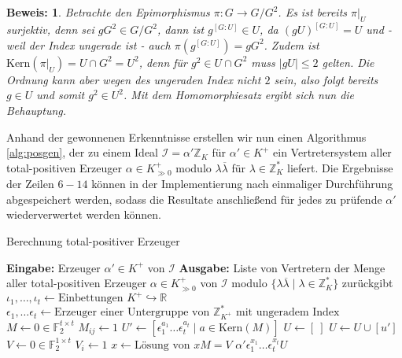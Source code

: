 \documentclass[12pt,a4paper,halfparskip,headsepline,bibtotocnumbered]{scrreprt}
\theoremstyle{nummermitklammern}
\theoremstyle{nonumberbreak}
\newtheorem{beweis}{Beweis:}
\newcommand{\Z}{\mathbb{Z}}
\newcommand{\R}{\mathbb{R}}
\newcommand{\F}{\mathbb{F}}
\newcommand{\I}{\mathcal{I}}
\newcommand{\Kern}{\text{Kern}}
\begin{document}
\begin{beweis}
	Betrachte den Epimorphismus $\pi : G \rightarrow G / G^2$. Es ist bereits $\pi\vert_U$ surjektiv, denn sei $gG^2 \in G / G^2$, dann ist $g^{\left[ G : U \right]} \in U$, da $(gU)^{\left[ G : U \right]} = U$ und - weil der Index ungerade ist - auch $\pi\left(g^{\left[ G : U \right]}\right) = gG^2$. Zudem ist $\Kern(\pi\vert_U) = U \cap G^2 = U^2$, denn für $g^2 \in U\cap G^2$ muss $\vert gU \vert \leq 2$ gelten. Die Ordnung kann aber wegen des ungeraden Index nicht $2$ sein, also folgt bereits $g \in U$ und somit $g^2 \in U^2$. Mit dem Homomorphiesatz ergibt sich nun die Behauptung.
\end{beweis}

Anhand der gewonnenen Erkenntnisse erstellen wir nun einen Algorithmus \eqref{alg:posgen}, der zu einem Ideal $\I = \alpha' \Z_K$ für $\alpha' \in K^+$ ein Vertretersystem aller total-positiven Erzeuger $\alpha \in K_{\gg 0}^+$ modulo $\lambda \overline{\lambda}$ für $\lambda \in \Z_K^\ast$ liefert. Die Ergebnisse der Zeilen $6 - 14$ können in der Implementierung nach einmaliger Durchführung abgespeichert werden, sodass die Resultate anschließend für jedes zu prüfende $\alpha'$ wiederverwertet werden können. 

\begin{algorithm}[H]
	\caption{Berechnung total-positiver Erzeuger}\label{alg:posgen}
	\begin{algorithmic}[1]
		\State \textbf{Eingabe:} Erzeuger $\alpha' \in K^+$ von $\I$
		\State \textbf{Ausgabe:} Liste von Vertretern der Menge aller total-positiven Erzeuger $\alpha \in K_{\gg 0}^+$ von $\I$ modulo $\lbrace \lambda \overline{\lambda} \mid \lambda \in \Z_K^\ast \rbrace$ zurückgibt
		\\
		\State $\iota_1, \dots, \iota_t \gets \text{Einbettungen } K^+ \hookrightarrow \R$
		\State $\epsilon_1, \dots \epsilon_t \gets \text{Erzeuger einer Untergruppe von } \Z_{K^+}^\ast \text{ mit ungeradem Index}$
		\State $M \gets 0 \in \F_2^{t \times t}$
				\State $M_{ij} \gets 1$
			\EndIf
		\EndFor
		\State $U' \gets \left[ \epsilon_1^{a_1} \dots \epsilon_t^{a_t} \mid a \in \Kern(M) \right]$
		\State $U \gets \left[ \ \right]$
			\If {$u' \neq u \lambda \overline{\lambda} \text{ für alle } u \in U, \lambda \in \Z_K^\ast$}
				\State $U \gets U \cup \left[ u' \right]$
			\EndIf
		\EndFor
		\State $V \gets 0 \in \F_2^{1 \times t}$
				\State $V_i \gets 1$
			\EndIf
		\EndFor
		\State $x \gets \text{Lösung von } xM = V$
		\State \Return $\alpha'\epsilon_1^{x_1} \dots \epsilon_t^{x_t} U$
	\end{algorithmic}
\end{algorithm}
\end{document}
